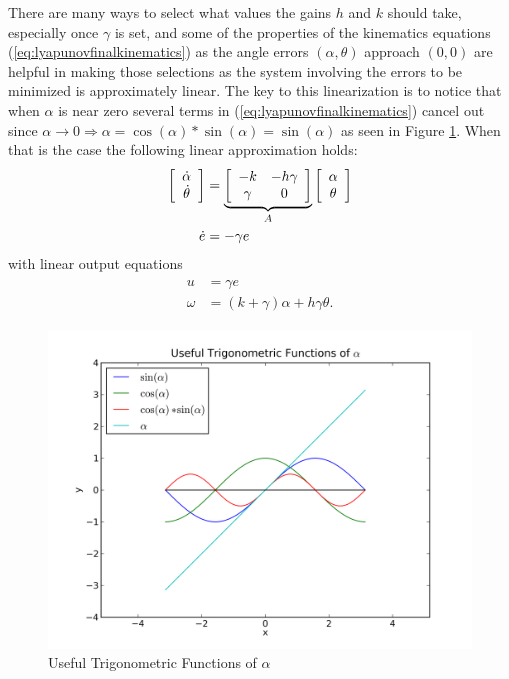 There are many ways to select what values the gains $h$ and $k$ should take, especially once $\gamma$ is set, and some of the properties of the kinematics equations (\ref{eq:lyapunovfinalkinematics}) as the angle errors $(\alpha, \theta)$ approach $(0, 0)$ are helpful in making those selections as the system involving the errors to be minimized is approximately linear. The key to this linearization is to notice that when $\alpha$ is near zero several terms in (\ref{eq:lyapunovfinalkinematics}) cancel out since $\alpha\to0\Rightarrow \alpha=\cos(\alpha)*\sin(\alpha)=\sin(\alpha)$ as seen in Figure \ref{fig:plotSinCos}. When that is the case the following linear approximation holds:
\begin{align}
\label{eq:lyapunovLinearSystem}
\begin{split}
\left[\begin{array}{c} \dot{\alpha} \\ \dot{\theta} \end{array}\right]
&= \underbrace{\left[\begin{array}{c c} -k & -h\gamma \\ \gamma & 0 \end{array}\right]}_{A}
\left[\begin{array}{c} \alpha \\ \theta \end{array}\right] \\
\dot{e} &= -\gamma e
\end{split}
\end{align}
with linear output equations
\begin{align}
\label{eq:lyapunovLinearOutput}
\begin{split}
u &= \gamma e \\
\omega &= (k+\gamma)\alpha + h\gamma\theta.
\end{split}
\end{align}

\begin{figure}[ht!]
	\centering
	\includegraphics[width=.75\textwidth]{images/plotSinCos}
	\caption{Useful Trigonometric Functions of $\alpha$}
	\label{fig:plotSinCos}
\end{figure}

